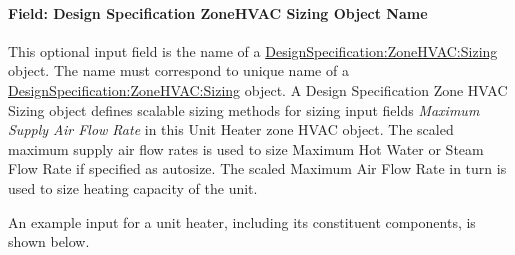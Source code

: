 \paragraph{Field: Design Specification ZoneHVAC Sizing Object Name}\label{field-design-specification-zonehvac-sizing-object-name-3}

This optional input field is the name of a \hyperref[designspecificationzonehvacsizing]{DesignSpecification:ZoneHVAC:Sizing} object. The name must correspond to unique name of a \hyperref[designspecificationzonehvacsizing]{DesignSpecification:ZoneHVAC:Sizing} object. A Design Specification Zone HVAC Sizing object defines scalable sizing methods for sizing input fields \emph{Maximum Supply Air Flow Rate} in this Unit Heater zone HVAC object. The scaled maximum supply air flow rates is used to size Maximum Hot Water or Steam Flow Rate if specified as autosize. The scaled Maximum Air Flow Rate in turn is used to size heating capacity of the unit.

An example input for a unit heater, including its constituent components, is shown below.

